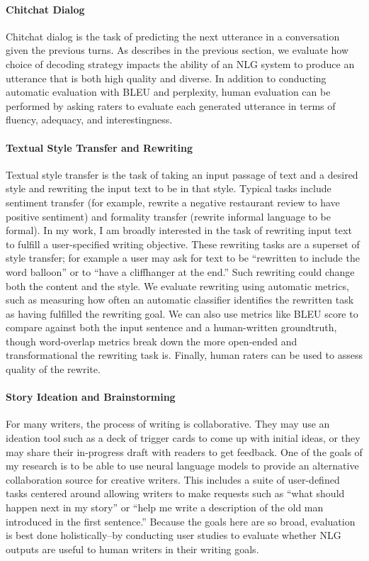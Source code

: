 \begin{itemize}
\paragraph{Chitchat Dialog}
Chitchat dialog is the task of predicting the next utterance in a conversation given the previous turns.
As describes in the previous section, we evaluate how choice of decoding strategy impacts the ability of an NLG system to produce an utterance that is both high quality and diverse.
In addition to conducting automatic evaluation with BLEU and perplexity, human evaluation can be performed by asking raters to evaluate each generated utterance in terms of fluency, adequacy, and interestingness.

\paragraph{Textual Style Transfer and Rewriting}
Textual style transfer is the task of taking an input passage of text and a desired style and rewriting the input text to be in that style.
Typical tasks include sentiment transfer (for example, rewrite a negative restaurant review to have positive sentiment) and formality transfer (rewrite informal language to be formal).
In my work, I am broadly interested in the task of rewriting input text to fulfill a user-specified writing objective.
These rewriting tasks are a superset of style transfer; for example a user may ask for text to be ``rewritten to include the word 
balloon'' or to ``have a cliffhanger at the end.''
Such rewriting could change both the content and the style.
We evaluate rewriting using automatic metrics, such as measuring how often an automatic classifier identifies the rewritten task as having fulfilled the rewriting goal.
We can also use metrics like BLEU score to compare against both the input sentence and a human-written groundtruth, though word-overlap metrics break down the more open-ended and transformational the rewriting task is.
Finally, human raters can be used to assess quality of the rewrite.

\paragraph{Story Ideation and Brainstorming}
For many writers, the process of writing is collaborative.
They may use an ideation tool such as a deck of trigger cards to come up with initial ideas, or they may share their in-progress draft with readers to get feedback.
One of the goals of my research is to be able to use neural language models to provide an alternative collaboration source for creative writers.
This includes a suite of user-defined tasks centered around allowing writers to make requests such as ``what should happen next in my story'' or ``help me write a description of the old man introduced in the first sentence.''
Because the goals here are so broad, evaluation is best done holistically--by conducting user studies to evaluate whether NLG outputs are useful to human writers in their writing goals.


\end{itemize}
